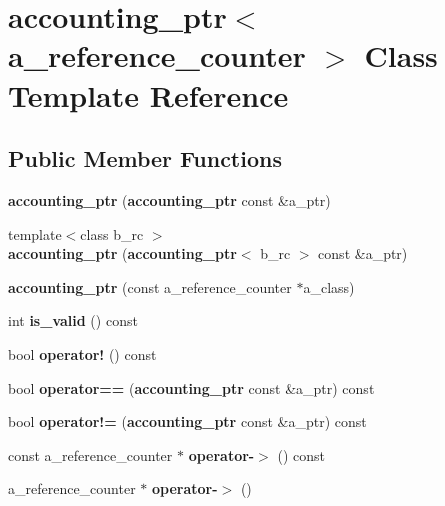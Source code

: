 \section{accounting\_\-ptr$<$ a\_\-reference\_\-counter $>$ Class Template Reference}
\label{classaccounting__ptr}
\subsection*{Public Member Functions}
\begin{DoxyCompactItemize}
\item 
{\bfseries accounting\_\-ptr} ({\bf accounting\_\-ptr} const \&a\_\-ptr)\label{classaccounting__ptr_a8141d21190a97a20d7abfd6e63ba1161}

\item 
{\footnotesize template$<$class b\_\-rc $>$ }\\{\bfseries accounting\_\-ptr} ({\bf accounting\_\-ptr}$<$ b\_\-rc $>$ const \&a\_\-ptr)\label{classaccounting__ptr_a3c4d0bd60c06a0cfc2d26e6892e034a9}

\item 
{\bfseries accounting\_\-ptr} (const a\_\-reference\_\-counter $\ast$a\_\-class)\label{classaccounting__ptr_a59f3770315b62534e93ada26a41ed192}

\item 
int {\bfseries is\_\-valid} () const \label{classaccounting__ptr_a714b2b2bcade1d6ee91d75aee7c67b24}

\item 
bool {\bfseries operator!} () const \label{classaccounting__ptr_a9d354fe76b1aa68b5abb2ae025049ea1}

\item 
bool {\bfseries operator==} ({\bf accounting\_\-ptr} const \&a\_\-ptr) const \label{classaccounting__ptr_aafb6b0ac4548c045ee3d7f6d2fc2ee15}

\item 
bool {\bfseries operator!=} ({\bf accounting\_\-ptr} const \&a\_\-ptr) const \label{classaccounting__ptr_aea136ea90a95e3a53aa3f545693cacad}

\item 
const a\_\-reference\_\-counter $\ast$ {\bfseries operator-\/$>$} () const \label{classaccounting__ptr_acc0f2124d873c147516af5d0379e12ba}

\item 
a\_\-reference\_\-counter $\ast$ {\bfseries operator-\/$>$} ()\label{classaccounting__ptr_afc228c301e6210960ff4cedc67090fd5}


\end{DoxyCompactItemize}
